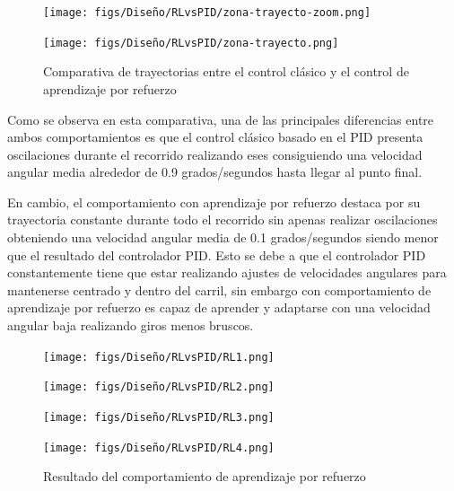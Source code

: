\begin{figure}[H]
  \centering
  \begin{minipage}{0.65\textwidth}
    \texttt{[image: figs/Diseño/RLvsPID/zona-trayecto-zoom.png]}
  \end{minipage}

  \vspace{1cm}

  \begin{minipage}{0.65\textwidth}
    \texttt{[image: figs/Diseño/RLvsPID/zona-trayecto.png]}
  \end{minipage}
  \caption{Comparativa de trayectorias entre el control clásico y el control de aprendizaje por refuerzo}
  \label{fig:Comparativa-de-trayectorias}
  \vspace{-1.5em}
\end{figure}

Como se observa en esta comparativa, una de las principales diferencias entre ambos comportamientos es que el control clásico basado en el PID presenta oscilaciones durante el recorrido 
realizando eses consiguiendo una velocidad angular media alrededor de 0.9 grados/segundos hasta llegar al punto final.  

En cambio, el comportamiento con aprendizaje por refuerzo destaca por su trayectoria constante durante todo el recorrido sin apenas realizar oscilaciones obteniendo una velocidad angular 
media de 0.1 grados/segundos siendo menor que el resultado del controlador PID. Esto se debe a que el controlador PID constantemente tiene que estar realizando ajustes de velocidades 
angulares para mantenerse centrado y dentro del carril, sin embargo con comportamiento de aprendizaje por refuerzo es capaz de aprender y adaptarse con una velocidad angular baja 
realizando giros menos bruscos. 

\begin{figure}[H]
  \centering
  \begin{minipage}{0.3\textwidth}
    \texttt{[image: figs/Diseño/RLvsPID/RL1.png]}
  \end{minipage}
  \hfill
  \begin{minipage}{0.3\textwidth}
    \texttt{[image: figs/Diseño/RLvsPID/RL2.png]}
  \end{minipage}
  \hfill
  \begin{minipage}{0.3\textwidth}
    \texttt{[image: figs/Diseño/RLvsPID/RL3.png]}
  \end{minipage}
  \hfill
  \begin{minipage}{0.3\textwidth}
    \texttt{[image: figs/Diseño/RLvsPID/RL4.png]}
  \end{minipage}
  \caption{Resultado del comportamiento de aprendizaje por refuerzo}
  \label{fig:Resultado-imagenes}
  \vspace{-1.5em}
\end{figure}

